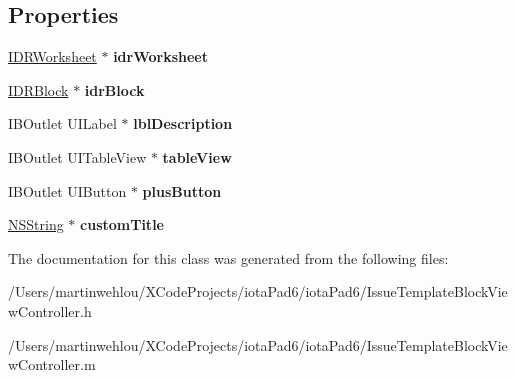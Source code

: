 \subsection*{Properties}
\begin{DoxyCompactItemize}
\item 
\hypertarget{interface_issue_template_block_view_controller_ace1b5d9eb8fb93d9af166a9ce0a6428f}{
\hyperlink{interface_i_d_r_worksheet}{IDRWorksheet} $\ast$ {\bfseries idrWorksheet}}
\label{interface_issue_template_block_view_controller_ace1b5d9eb8fb93d9af166a9ce0a6428f}

\item 
\hypertarget{interface_issue_template_block_view_controller_a54771d9b9a6f13be0cd2b556a4fc1675}{
\hyperlink{interface_i_d_r_block}{IDRBlock} $\ast$ {\bfseries idrBlock}}
\label{interface_issue_template_block_view_controller_a54771d9b9a6f13be0cd2b556a4fc1675}

\item 
\hypertarget{interface_issue_template_block_view_controller_aca858fef2d9ad4b4dd17472946ec6517}{
IBOutlet UILabel $\ast$ {\bfseries lblDescription}}
\label{interface_issue_template_block_view_controller_aca858fef2d9ad4b4dd17472946ec6517}

\item 
\hypertarget{interface_issue_template_block_view_controller_ae18ddacba499544b33ce7000eab3e239}{
IBOutlet UITableView $\ast$ {\bfseries tableView}}
\label{interface_issue_template_block_view_controller_ae18ddacba499544b33ce7000eab3e239}

\item 
\hypertarget{interface_issue_template_block_view_controller_aa7ca12b79c130a7ba570bb21e2b93a26}{
IBOutlet UIButton $\ast$ {\bfseries plusButton}}
\label{interface_issue_template_block_view_controller_aa7ca12b79c130a7ba570bb21e2b93a26}

\item 
\hypertarget{interface_issue_template_block_view_controller_a7becb003b30951d194377fc9d23115be}{
\hyperlink{class_n_s_string}{NSString} $\ast$ {\bfseries customTitle}}
\label{interface_issue_template_block_view_controller_a7becb003b30951d194377fc9d23115be}

\end{DoxyCompactItemize}


The documentation for this class was generated from the following files:\begin{DoxyCompactItemize}
\item 
/Users/martinwehlou/XCodeProjects/iotaPad6/iotaPad6/IssueTemplateBlockViewController.h\item 
/Users/martinwehlou/XCodeProjects/iotaPad6/iotaPad6/IssueTemplateBlockViewController.m\end{DoxyCompactItemize}
